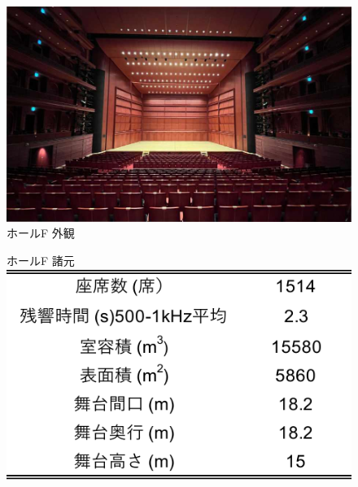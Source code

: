 \documentclass[11pt,a4j]{jreport}
\begin{document}
  \begin{figure}[H]
    \begin{minipage}{0.5\textwidth} %
      \centering
      \includegraphics[width=.8\linewidth]{images/measuredHalls/resized/picture_f.jpg}
      \\ホールF 外観
      \vspace{2\baselineskip}

      ホールF 諸元\\
      \includegraphics[width=.8\linewidth]{images/measuredHalls/informationTable/f.pdf}
      \vspace{2\baselineskip}


\end{minipage}
\end{figure}
\end{document}
